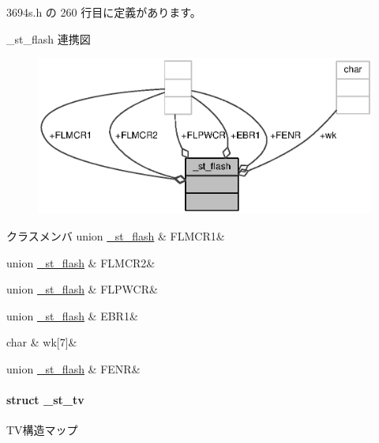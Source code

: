  3694s.\+h の 260 行目に定義があります。



\+\_\+st\+\_\+flash 連携図
\nopagebreak
\begin{figure}[H]
\begin{center}
\leavevmode
\includegraphics[width=350pt]{db/d3e/struct__st__flash__coll__graph}
\end{center}
\end{figure}
\begin{DoxyFields}{クラスメンバ}
union \hyperlink{3694s_8h_de/dc4/union__st__flash_8FLMCR1}{\+\_\+st\+\_\+flash}\label{3694s_8h_ab2c223623000c27d956694b0137bb4f1}
&
F\+L\+M\+C\+R1&
\\
\hline

union \hyperlink{3694s_8h_d9/da0/union__st__flash_8FLMCR2}{\+\_\+st\+\_\+flash}\label{3694s_8h_ae3581531d30f0ae8515167b31c9760b2}
&
F\+L\+M\+C\+R2&
\\
\hline

union \hyperlink{3694s_8h_d9/dfc/union__st__flash_8FLPWCR}{\+\_\+st\+\_\+flash}\label{3694s_8h_af193b5cbd1ccc660e4532abf240fb33d}
&
F\+L\+P\+W\+C\+R&
\\
\hline

union \hyperlink{3694s_8h_d8/d9e/union__st__flash_8EBR1}{\+\_\+st\+\_\+flash}\label{3694s_8h_a61fac54ad8d593c44904c5380de176a8}
&
E\+B\+R1&
\\
\hline

char\label{3694s_8h_abcd1efa630e3ba8c0691f49ee9906089}
&
wk\mbox{[}7\mbox{]}&
\\
\hline

union \hyperlink{3694s_8h_dc/d43/union__st__flash_8FENR}{\+\_\+st\+\_\+flash}\label{3694s_8h_aa2a8c7e6f17496a241b0ef008b3074d5}
&
F\+E\+N\+R&
\\
\hline

\end{DoxyFields}
\label{struct__st__tv}
\paragraph{struct \+\_\+st\+\_\+tv}
T\+V構造マップ 

